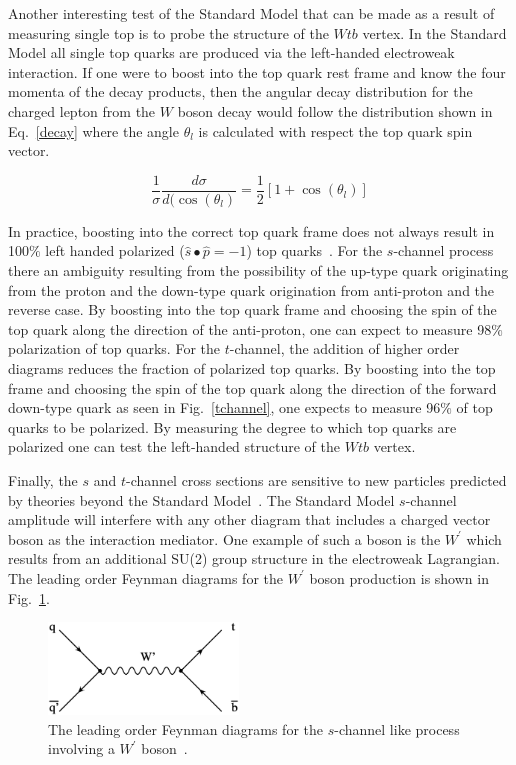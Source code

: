 Another interesting test of the Standard Model that can be made as a result of measuring single top is to probe the structure of the $Wtb$ vertex. In the Standard Model all single top quarks are produced via the left-handed electroweak interaction. If one were to boost into the top quark rest frame and know the four momenta of the decay products, then the angular decay distribution for the charged lepton from the $W$ boson decay would follow the distribution shown in Eq.~\ref{decay} where the angle $\theta_{l}$ is calculated with respect the top quark spin vector.

\begin{equation}
\frac{1}{\sigma}\frac{d\sigma}{d(\cos(\theta_{l})} = \frac{1}{2}\left[ 1 + \cos(\theta_{l}) \right]
\label{decay}
\end{equation}

In practice, boosting into the correct top quark frame does not always result in 100$\%$ left handed polarized ($\hat{s} \bullet \hat{p}=-1$) top quarks~\cite{Mahlon:1998uv}. For the $s$-channel process there an ambiguity resulting from the possibility of the up-type quark originating from the proton and the down-type quark origination from anti-proton and the reverse case. By boosting into the top quark frame and choosing the spin of the top quark along the direction of the anti-proton, one can expect to measure 98$\%$ polarization of top quarks. For the $t$-channel, the addition of higher order diagrams reduces the fraction of polarized top quarks. By boosting into the top frame and choosing the spin of the top quark along the direction of the forward down-type quark as seen in Fig.~\ref{tchannel}, one expects to measure 96$\%$ of top quarks to be polarized. By measuring the degree to which top quarks are polarized one can test the left-handed structure of the $Wtb$ vertex.

Finally, the $s$ and $t$-channel cross sections are sensitive to new particles predicted by theories beyond the Standard Model~\cite{PhysRevD.63.014018}. The Standard Model $s$-channel amplitude will interfere with any other diagram that includes a charged vector boson as the interaction mediator. One example of such a boson is the $W^{'}$ which results from an additional SU(2) group structure in the electroweak Lagrangian. The leading order Feynman diagrams for the $W^{'}$ boson production is shown in Fig.~\ref{schannelnew}.

\begin{figure}[!h!tbp]
\begin{center}
\includegraphics[width=0.45\textwidth]{eps/Theory/wprime.eps}
\end{center}
\vspace{-0.1in}
\caption{The leading order Feynman diagrams for the $s$-channel like process involving a $W^{'}$ boson~\cite{Jabeen:2006km}.}
\label{schannelnew}
\end{figure}

